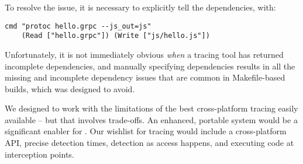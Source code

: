 To resolve the issue, it is necessary to explicitly tell \Rattle the dependencies, with:

\begin{verbatim}
cmd "protoc hello.grpc --js_out=js"
    (Read ["hello.grpc"]) (Write ["js/hello.js"])
\end{verbatim}

Unfortunately, it is not immediately obvious \emph{when} a tracing tool has returned incomplete dependencies, and manually specifying dependencies results in all the missing and incomplete dependency issues that are common in Makefile-based builds, which \Rattle was designed to avoid.

\vspace{2mm}




We designed \Rattle to work with the limitations of the best cross-platform tracing easily available -- but that involves trade-offs. An enhanced, portable system would be a significant enabler for \Rattle.
Our wishlist for tracing would include a cross-platform API, precise detection times, detection as access happens, and executing code at interception points.

